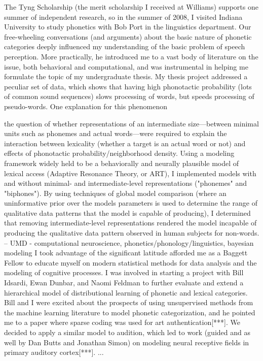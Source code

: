 \documentclass[12pt]{article}
\begin{document}


   The Tyng Scholarship (the merit scholarship I received at Williams) supports one summer of independent research, so in the summer of 2008, I visited Indiana University to study phonetics with Bob Port in the linguistics department.  Our free-wheeling conversations (and arguments) about the basic nature of phonetic categories deeply influenced my understanding of the basic problem of speech perception.  More practically, he introduced me to a vast body of literature on the issue, both behavioral and computational, and was instrumental in helping me formulate the topic of my undergraduate thesis.
   My thesis project addressed a peculiar set of data, which shows that having high phonotactic probability (lots of common sound sequences) slows processing of words, but speeds processing of pseudo-words.  One explanation for this phenomenon 

 the question of whether representations of an intermediate size---between minimal units such as phonemes and actual words---were required to explain the interaction between lexicality (whether a target is an actual word or not) and effects of phonotactic probability/neighborhood density.  Using a modeling framework widely held to be a behaviorally and neurally plausible model of lexical access (Adaptive Resonance Theory, or ART), I implemented models with and without minimal- and intermediate-level representations ("phonemes" and "biphones").  By using techniques of global model comparison (where an uninformative prior over the models parameters is used to determine the range of qualitative data patterns that the model is capable of producing), I determined that removing intermediate-level representations rendered the model incapable of producing the qualitative data pattern observed in human subjects for non-words.
-- UMD - computational neuroscience, phonetics/phonology/linguistics, bayesian modeling
   I took advantage of the significant latitude afforded me as a Baggett Fellow to educate myself on modern statistical methods for data analysis and the modeling of cognitive processes.  I was involved in starting a project with Bill Idsardi, Ewan Dunbar, and Naomi Feldman to further evaluate and extend a hierarchical model of distributional learning of phonetic and lexical categories.
   Bill and I were excited about the prospects of using unsupervised methods from the machine learning literature to model phonetic categorization, and he pointed me to a paper where sparse coding was used for art authentication[***].  We decided to apply a similar model to audition, which led to work (guided and as well by Dan Butts and Jonathan Simon) on modeling neural receptive fields in primary auditory cortex[***]. ...
\end{document}
